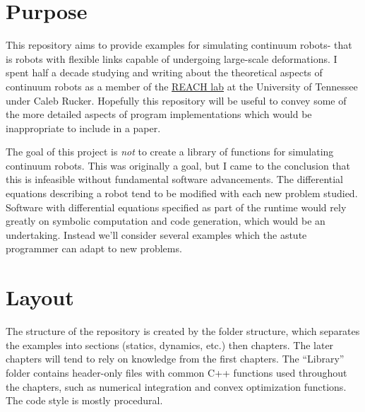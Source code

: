 \documentclass[12pt]{article}
\begin{document}
\makeatletter
\renewcommand{\@maketitle}{
\newpage
\null
\vskip 2em
\begin{center}
{\LARGE \@title \par}
\end{center}
\par
} \makeatother

\maketitle

\section{Purpose}
This repository aims to provide examples for simulating continuum robots- that is robots with flexible links capable of undergoing large-scale deformations. I spent half a decade studying and writing about the theoretical aspects of continuum robots as a member of the \href{https://sites.google.com/site/danielcrucker/}{REACH lab} at the University of Tennessee under Caleb Rucker. Hopefully this repository will be useful to convey some of the more detailed aspects of program implementations which would be inappropriate to include in a paper.

The goal of this project is \emph{not} to create a library of functions for simulating continuum robots. This was originally a goal, but I came to the conclusion that this is infeasible without fundamental software advancements. The differential equations describing a robot tend to be modified with each new problem studied. Software with differential equations specified as part of the runtime would rely greatly on symbolic computation and code generation, which would be an undertaking. Instead we'll consider several examples which the astute programmer can adapt to new problems.

\section{Layout}
The structure of the repository is created by the folder structure, which separates the examples into sections (statics, dynamics, etc.) then chapters. The later chapters will tend to rely on knowledge from the first chapters. The ``Library'' folder contains header-only files with common C++ functions used throughout the chapters, such as numerical integration and convex optimization functions. The code style is mostly procedural.
\end{document}
